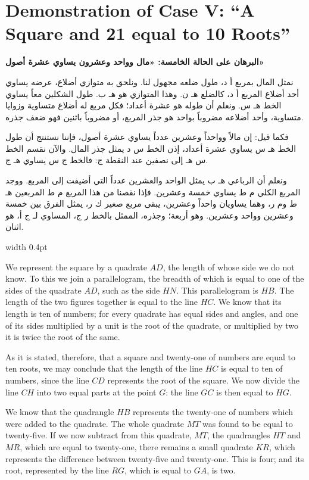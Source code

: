 \documentclass[11pt,a4paper,openany,oneside]{book}
\begin{document}
\newpage

\section*{Demonstration of Case V: ``A Square and 21 equal to 10 Roots''}

\noindent\begin{minipage}[t]{0.48\textwidth}
\raggedleft

\begin{Arabic}
\textbf{البرهان على الحالة الخامسة: «مال وواحد وعشرون يساوي عشرة أصول»}

نمثل المال بمربع أ د، طول ضلعه مجهول لنا. ونلحق به متوازي أضلاع، عرضه يساوي أحد أضلاع المربع أ د، كالضلع هـ ن. وهذا المتوازي هو هـ ب. طول الشكلين معاً يساوي الخط هـ س. ونعلم أن طوله هو عشرة أعداد؛ فكل مربع له أضلاع متساوية وزوايا متساوية، وأحد أضلاعه مضروباً بواحد هو جذر المربع، أو مضروباً باثنين فهو ضعف جذره.

فكما قيل: إن مالاً وواحداً وعشرين عدداً يساوي عشرة أصول، فإننا نستنتج أن طول الخط هـ س يساوي عشرة أعداد، إذن الخط س د يمثل جذر المال. والآن نقسم الخط س هـ إلى نصفين عند النقطة ج: فالخط ج س يساوي هـ ج.

ونعلم أن الرباعي هـ ب يمثل الواحد والعشرين عدداً التي أضيفت إلى المربع. ووجد المربع الكلي م ط يساوي خمسة وعشرين. فإذا نقصنا من هذا المربع م ط المربعين هـ ط وم ر، وهما يساويان واحداً وعشرين، يبقى مربع صغير ك ر، يمثل الفرق بين خمسة وعشرين وواحد وعشرين. وهو أربعة؛ وجذره، الممثل بالخط ر ج، المساوي لـ ج أ، هو اثنان.
\end{Arabic}

\end{minipage}%
\hfill\vrule width 0.4pt\hfill
\begin{minipage}[t]{0.48\textwidth}
\raggedright

We represent the square by a quadrate $AD$, the length of whose side we do not know. To this we join a parallelogram, the breadth of which is equal to one of the sides of the quadrate $AD$, such as the side $HN$. This parallelogram is $HB$. The length of the two figures together is equal to the line $HC$. We know that its length is ten of numbers; for every quadrate has equal sides and angles, and one of its sides multiplied by a unit is the root of the quadrate, or multiplied by two it is twice the root of the same.

As it is stated, therefore, that a square and twenty-one of numbers are equal to ten roots, we may conclude that the length of the line $HC$ is equal to ten of numbers, since the line $CD$ represents the root of the square. We now divide the line $CH$ into two equal parts at the point $G$: the line $GC$ is then equal to $HG$.

We know that the quadrangle $HB$ represents the twenty-one of numbers which were added to the quadrate. The whole quadrate $MT$ was found to be equal to twenty-five. If we now subtract from this quadrate, $MT$, the quadrangles $HT$ and $MR$, which are equal to twenty-one, there remains a small quadrate $KR$, which represents the difference between twenty-five and twenty-one. This is four; and its root, represented by the line $RG$, which is equal to $GA$, is two.

\end{minipage}
\end{document}

